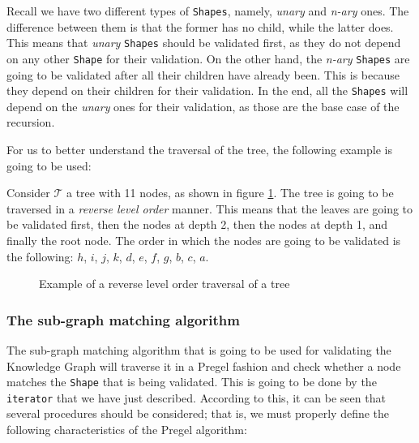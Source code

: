 Recall we have two different types of \texttt{Shapes}, namely, \textit{unary} and \textit{n-ary} ones. The difference between them is that the former has no child, while the latter does. This means that \textit{unary} \texttt{Shapes} should be validated first, as they do not depend on any other \texttt{Shape} for their validation. On the other hand, the \textit{n-ary} \texttt{Shapes} are going to be validated after all their children have already been. This is because they depend on their children for their validation. In the end, all the \texttt{Shapes} will depend on the \textit{unary} ones for their validation, as those are the base case of the recursion.

For us to better understand the traversal of the tree, the following example is going to be used:

\begin{example}
    Consider $\mathcal{T}$ a tree with 11 nodes, as shown in figure \ref{fig:tree_traversal}. The tree is going to be traversed in a \textit{reverse level order} manner. This means that the leaves are going to be validated first, then the nodes at depth 2, then the nodes at depth 1, and finally the root node. The order in which the nodes are going to be validated is the following: $h$, $i$, $j$, $k$, $d$, $e$, $f$, $g$, $b$, $c$, $a$.
    \begin{figure}[ht]
        \centering
        
        \caption{Example of a reverse level order traversal of a tree}
        \label{fig:tree_traversal}
    \end{figure}
\end{example}

\subsubsection{The sub-graph matching algorithm}

The sub-graph matching algorithm that is going to be used for validating the Knowledge Graph will traverse it in a Pregel fashion and check whether a node matches the \texttt{Shape} that is being validated. This is going to be done by the \texttt{iterator} that we have just described. According to this, it can be seen that several procedures should be considered; that is, we must properly define the following characteristics of the Pregel algorithm:

